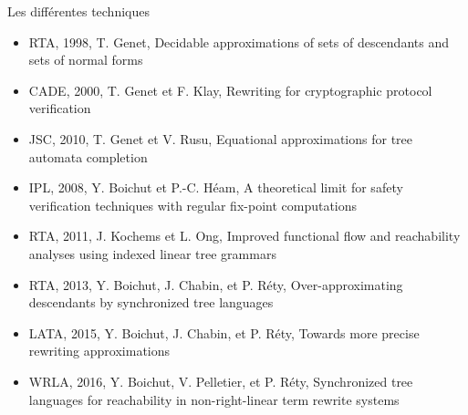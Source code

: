 \documentclass[xcolor={dvipsnames}]{beamer}
\begin{document}
\begin{frame}{Les différentes techniques}
  \vspace{\baselineskip}
  \begin{overprint}
    \begin{itemize}
    \item RTA, 1998, T. Genet, {\footnotesize Decidable approximations of sets of descendants and sets of normal forms}
    \item CADE, 2000, T. Genet et F. Klay, {\footnotesize Rewriting for cryptographic protocol verification}
    \item JSC, 2010, T. Genet et V. Rusu, {\footnotesize Equational approximations for tree automata completion}
    \end{itemize}
    \begin{itemize}
    \item IPL, 2008, Y. Boichut et P.-C. Héam, {\footnotesize A theoretical limit for safety verification techniques with regular fix-point computations}
    \end{itemize}
    \begin{itemize}
    \item RTA, 2011, J. Kochems et L. Ong, {\footnotesize Improved functional flow and reachability analyses using indexed linear tree grammars}
    \end{itemize}
    \begin{itemize}
    \item RTA, 2013, Y. Boichut, J. Chabin, et P. Réty, {\footnotesize Over-approximating descendants by synchronized tree languages}
    \end{itemize}
    \begin{itemize}
    \item LATA, 2015, Y. Boichut, J. Chabin, et P. Réty, {\footnotesize Towards more precise rewriting approximations}
    \end{itemize}
    \begin{itemize}
    \item WRLA, 2016, Y. Boichut, V. Pelletier, et P. Réty, {\footnotesize Synchronized tree languages for reachability in non-right-linear term rewrite systems}
    \end{itemize}
  \end{overprint}
\end{frame}
\end{document}
